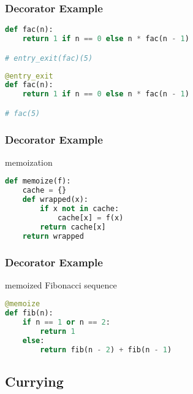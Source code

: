 \documentclass[dvipsnames]{beamer}
\theoremstyle{plain}
\begin{document}
\begin{frame}[fragile]
  \frametitle{Decorator Example}

  \begin{exampleblock}{}
    \begin{lstlisting}[language=Python]
def fac(n):
    return 1 if n == 0 else n * fac(n - 1)

# entry_exit(fac)(5)
    \end{lstlisting}

    \pause
    \medskip
    \begin{lstlisting}[language=Python]
@entry_exit
def fac(n):
    return 1 if n == 0 else n * fac(n - 1)

# fac(5)
    \end{lstlisting}
  \end{exampleblock}
\end{frame}

\begin{frame}[fragile]
  \frametitle{Decorator Example}

  \begin{exampleblock}{memoization}
    \begin{lstlisting}[language=Python]
def memoize(f):
    cache = {}
    def wrapped(x):
        if x not in cache:
            cache[x] = f(x)
        return cache[x]
    return wrapped
    \end{lstlisting}
  \end{exampleblock}
\end{frame}

\begin{frame}[fragile]
  \frametitle{Decorator Example}

  \begin{exampleblock}{memoized Fibonacci sequence}
    \begin{lstlisting}[language=Python]
@memoize
def fib(n):
    if n == 1 or n == 2:
        return 1
    else:
        return fib(n - 2) + fib(n - 1)
    \end{lstlisting}
  \end{exampleblock}
\end{frame}

\subsection{Currying}
\end{document}
